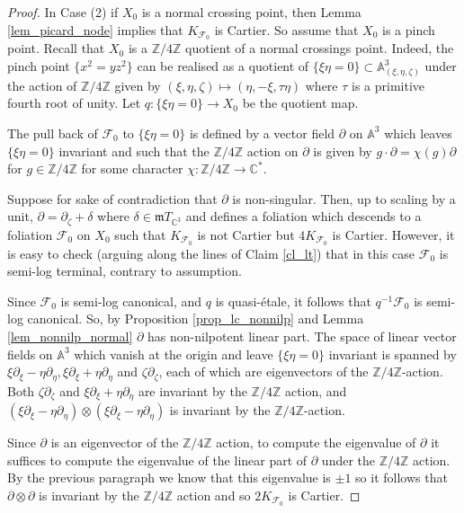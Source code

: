 \documentclass[12pt, a4paper]{amsart}
\theoremstyle{definition}
\theoremstyle{named}
\begin{document}
\begin{proof}
\medskip

In Case (2) if $X_0$ is a normal crossing point, then Lemma \ref {lem_picard_node} implies that $K_{\mathcal F_0}$ is Cartier.  So assume that $X_0$ is a pinch point.  Recall that $X_0$ is a $\mathbb Z/4\mathbb Z$ quotient of
 a normal crossings point.
 Indeed, the pinch point  $\{x^2=yz^2\}$ can be realised as a quotient of $\{\xi\eta = 0\} \subset \mathbb A_{(\xi, \eta, \zeta)}^3$ under the action of $\mathbb Z/4\mathbb Z$ given by
$(\xi, \eta, \zeta) \mapsto (\eta, -\xi, \tau \eta)$ where $\tau$ is a primitive fourth root of unity.
Let $q\colon \{\xi\eta = 0\} \rightarrow X_0$ be the quotient map.

The pull back of  $\mathcal F_0$
to $\{\xi\eta = 0\}$ is defined by a vector field 
$\partial$ on $\mathbb A^3$ which leaves 
$\{\xi \eta = 0\}$ invariant and such that the $\mathbb Z/4\mathbb Z$ action on $\partial$ is given by $g \cdot \partial = \chi(g)\partial$ for $g \in \mathbb Z/4\mathbb Z$ for some character $\chi\colon \mathbb Z/4\mathbb Z \to \mathbb C^*$.  

Suppose for sake of contradiction that $\partial$ is non-singular.  Then, up to scaling by a unit, $\partial = \partial_\zeta+\delta$ where $\delta \in \mathfrak mT_{\mathbb C^3}$ and defines a foliation 
which descends to a foliation $\mathcal F_0$ on $X_0$
such that $K_{\mathcal F_0}$ is not Cartier but $4K_{\mathcal F_0}$ is Cartier.  However, it is easy to check (arguing along the lines of Claim \ref{cl_lt})
that in this case $\mathcal F_0$ is semi-log terminal, 
contrary to assumption.


Since $\mathcal F_0$ is semi-log canonical, and $q$ is quasi-\'etale, it follows that $q^{-1}\mathcal F_0$ is semi-log canonical.  So, by Proposition \ref{prop_lc_nonnilp} and Lemma \ref{lem_nonnilp_normal} $\partial$ has non-nilpotent linear part. The space of linear vector fields on $\mathbb A^3$ which vanish at the origin and leave $\{\xi\eta = 0\}$ invariant is spanned by
$\xi\partial_\xi-\eta\partial_\eta, \xi\partial_\xi+\eta\partial_\eta$ and $\zeta\partial_\zeta$, each of which are eigenvectors of the $\mathbb Z/4\mathbb Z$-action.
Both $\zeta\partial_\zeta$ and $\xi\partial_\xi+\eta\partial_\eta$
are invariant by the $\mathbb Z/4\mathbb Z$ action, and 
$(\xi\partial_\xi-\eta\partial_\eta)\otimes( \xi\partial_\xi-\eta\partial_\eta)$ is invariant by the $\mathbb Z/4\mathbb Z$-action.

Since $\partial$ is an eigenvector of the $\mathbb Z/4\mathbb Z$ action, to compute the eigenvalue of $\partial$ it suffices to compute the eigenvalue of the linear part of $\partial$ under the $\mathbb Z/4\mathbb Z$ action.  By the previous paragraph we know that this eigenvalue is $\pm 1$ so it follows that 
 $\partial\otimes \partial$ is invariant by the $\mathbb Z/4\mathbb Z$ action and so $2K_{\mathcal F_0}$ is Cartier.




\end{proof}
\end{document}
